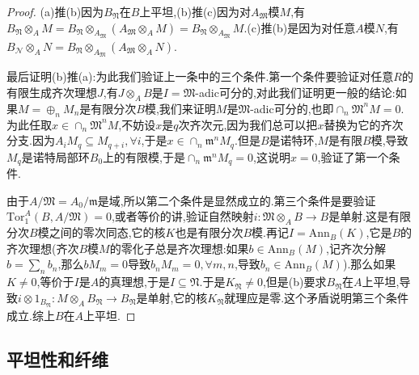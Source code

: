 \begin{enumerate}
\begin{proof}
    	(a)推(b)因为$B_{\mathfrak{N}}$在$B$上平坦,(b)推(c)因为对$A_{\mathfrak{M}}$模$M$,有$B_{\mathfrak{N}}\otimes_AM=B_{\mathfrak{N}}\otimes_{A_{\mathfrak{M}}}(A_{\mathfrak{M}}\otimes_AM)=B_{\mathfrak{N}}\otimes_{A_{\mathfrak{M}}}M$.(c)推(b)是因为对任意$A$模$N$,有$B_{\mathscr{N}}\otimes_AN=B_{\mathfrak{N}}\otimes_{A_{\mathfrak{M}}}\left(A_{\mathfrak{M}}\otimes_AN\right)$.
    	
    	\qquad
    	
    	最后证明(b)推(a):为此我们验证上一条中的三个条件.第一个条件要验证对任意$R$的有限生成齐次理想$J$,有$J\otimes_AB$是$I=\mathfrak{M}$-adic可分的,对此我们证明更一般的结论:如果$M=\oplus_nM_n$是有限分次$B$模,我们来证明$M$是$\mathfrak{M}$-adic可分的,也即$\cap_n\mathfrak{M}^nM=0$.为此任取$x\in\cap_n\mathfrak{M}^nM$,不妨设$x$是$q$次齐次元,因为我们总可以把$x$替换为它的齐次分支.因为$A_iM_q\subseteq M_{q+i},\forall i$,于是$x\in\cap_n\mathfrak{m}^nM_q$.但是$B$是诺特环,$M$是有限$B$模,导致$M_q$是诺特局部环$B_0$上的有限模,于是$\cap_n\mathfrak{m}^nM_q=0$,这说明$x=0$,验证了第一个条件.
    	
    	\qquad
    	
    	由于$A/\mathfrak{M}=A_0/\mathfrak{m}$是域,所以第二个条件是显然成立的.第三个条件是要验证$\mathrm{Tor}_1^A(B,A/\mathfrak{M})=0$,或者等价的讲,验证自然映射$i:\mathfrak{M}\otimes_AB\to B$是单射.这是有限分次$B$模之间的零次同态,它的核$K$也是有限分次$B$模.再记$I=\mathrm{Ann}_B(K)$,它是$B$的齐次理想(齐次$B$模$M$的零化子总是齐次理想:如果$b\in\mathrm{Ann}_B(M)$,记齐次分解$b=\sum_nb_n$,那么$bM_m=0$导致$b_nM_m=0,\forall m,n$,导致$b_n\in\mathrm{Ann}_B(M)$).那么如果$K\not=0$,等价于$I$是$A$的真理想,于是$I\subseteq\mathfrak{N}$.于是$K_{\mathfrak{N}}\not=0$,但是(b)要求$B_{\mathfrak{N}}$在$A$上平坦,导致$i\otimes1_{B_{\mathfrak{N}}}:M\otimes_AB_{\mathfrak{N}}\to B_{\mathfrak{N}}$是单射,它的核$K_{\mathfrak{N}}$就理应是零.这个矛盾说明第三个条件成立.综上$B$在$A$上平坦.
    \end{proof}
\end{enumerate}
\newpage
\subsection{平坦性和纤维}

